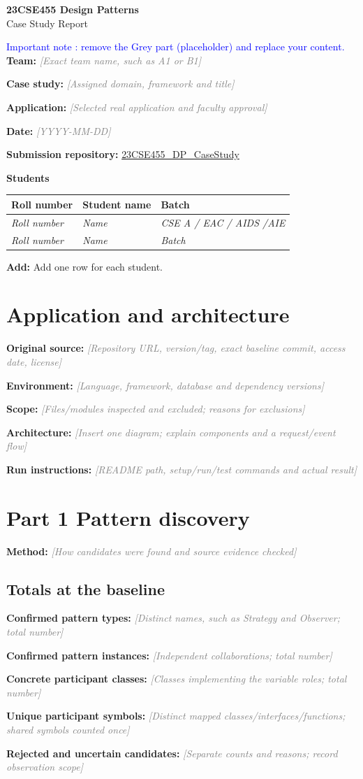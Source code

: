 \documentclass[11pt,a4paper]{article}
\newcommand{\entry}[2]{\textbf{#1:} \textcolor{gray}{\textit{[#2]}}\par}
\newcommand{\help}[1]{\textbf{Add:} #1\par}
\begin{document}
\begin{center}\Large\textbf{23CSE455 Design Patterns}\\[4pt]\LARGE Case Study Report\end{center}
\textcolor{blue}{Important note : remove the Grey part (placeholder) and replace your content.}\\

\entry{Team}{Exact team name, such as A1 or B1}
\entry{Case study}{Assigned domain, framework and title}
\entry{Application}{Selected real application and faculty approval}
\entry{Date}{YYYY-MM-DD}
\textbf{Submission repository:} \href{https://github.com/aswathymohan-amrita/23CSE455_DP_CaseStudy}{23CSE455\_DP\_CaseStudy}\par
\textbf{Students}\par
\begin{tabularx}{\linewidth}{@{}llX@{}}\toprule
Roll number & Student name & Batch\\\midrule
\textit{Roll number} & \textit{Name} & \textit{CSE A / EAC / AIDS /AIE}\\
\textit{Roll number} & \textit{Name} & \textit{Batch}\\\bottomrule
\end{tabularx}
\help{Add one row for each student.}

\section{Application and architecture}
\entry{Original source}{Repository URL, version/tag, exact baseline commit, access date, license}
\entry{Environment}{Language, framework, database and dependency versions}
\entry{Scope}{Files/modules inspected and excluded; reasons for exclusions}
\entry{Architecture}{Insert one diagram; explain components and a request/event flow}
\entry{Run instructions}{README path, setup/run/test commands and actual result}
\section{Part 1 Pattern discovery}
\entry{Method}{How candidates were found and source evidence checked}
\subsection{Totals at the baseline}
\entry{Confirmed pattern types}{Distinct names, such as Strategy and Observer; total number}
\entry{Confirmed pattern instances}{Independent collaborations; total number}
\entry{Concrete participant classes}{Classes implementing the variable roles; total number}
\entry{Unique participant symbols}{Distinct mapped classes/interfaces/functions; shared symbols counted once}
\entry{Rejected and uncertain candidates}{Separate counts and reasons; record observation scope}
\end{document}
